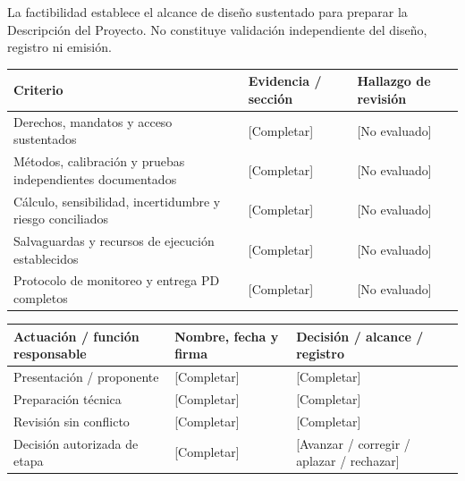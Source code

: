 \begin{Notice}La factibilidad establece el alcance de diseño sustentado para preparar la Descripción del Proyecto. No constituye validación independiente del diseño, registro ni emisión.\end{Notice}
{\sffamily\fontsize{8.3}{10.3}\selectfont\begin{longtable}{@{}P{80.84mm} P{42.89mm} P{41.24mm}@{}}
\toprule
\textbf{Criterio} & \textbf{Evidencia / sección} & \textbf{Hallazgo de revisión}\\\midrule\endhead
\rule{0pt}{7.7mm}Derechos, mandatos y acceso sustentados & [Completar] & [No evaluado]\\\hline
\rule{0pt}{7.7mm}Métodos, calibración y pruebas independientes documentados & [Completar] & [No evaluado]\\\hline
\rule{0pt}{7.7mm}Cálculo, sensibilidad, incertidumbre y riesgo conciliados & [Completar] & [No evaluado]\\\hline
\rule{0pt}{7.7mm}Salvaguardas y recursos de ejecución establecidos & [Completar] & [No evaluado]\\\hline
\rule{0pt}{7.7mm}Protocolo de monitoreo y entrega PD completos & [Completar] & [No evaluado]\\\hline
\end{longtable}}
{\sffamily\fontsize{8.3}{10.3}\selectfont\begin{longtable}{@{}P{51.14mm} P{56.09mm} P{57.74mm}@{}}
\toprule
\textbf{Actuación / función responsable} & \textbf{Nombre, fecha y firma} & \textbf{Decisión / alcance / registro}\\\midrule\endhead
\rule{0pt}{7.7mm}Presentación / proponente & [Completar] & [Completar]\\\hline
\rule{0pt}{7.7mm}Preparación técnica & [Completar] & [Completar]\\\hline
\rule{0pt}{7.7mm}Revisión sin conflicto & [Completar] & [Completar]\\\hline
\rule{0pt}{7.7mm}Decisión autorizada de etapa & [Completar] & [Avanzar / corregir / aplazar / rechazar]\\\hline
\end{longtable}}

